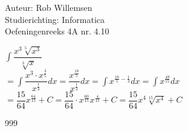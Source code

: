 \documentclass[a4paper]{article}
\newcommand{\dint}{\displaystyle\int}
\begin{document}
\noindent \large Auteur: Rob Willemsen \\
\noindent \large Studierichting: Informatica \\
\noindent \large Oefeningenreeks 4A nr. 4.10 \\

\medskip

\normalsize

$\dint \dfrac{x^3 \sqrt[5]{x^3}}{\sqrt[3]{x}}$ \\

$=\dint \dfrac{x^3 \cdot x^{\tfrac{3}{5}}}{x^{\tfrac{1}{3}}} dx = \dfrac{x^{\tfrac{18}{5}}}{x^{\tfrac{1}{3}}} dx = \dint x^{\tfrac{18}{5} - \tfrac{1}{3}} dx = \dint x^{\tfrac{49}{15}} dx$ \\

$= \dfrac{15}{64} x^{\tfrac{64}{15}} + C = \dfrac{15}{64} \cdot x^{\tfrac{60}{15}} x^{\tfrac{4}{15}} + C = \dfrac{15}{64} x^4 \sqrt[15]{x^4} + C$ \\

\begin{thebibliography}{999}
\end{thebibliography}
\end{document}
